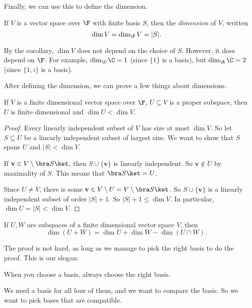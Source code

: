 \documentclass[a4paper]{article}
\begin{document}
Finally, we can use this to define the dimension.
\begin{defi}[Dimension]
  If $V$ is a vector space over $\F$ with finite basis $S$, then the \emph{dimension} of $V$, written
  \[
    \dim V = \dim_{\F}V = |S|.
  \]
\end{defi}
By the corollary, $\dim V$ does not depend on the choice of $S$. However, it does depend on $\F$. For example, $\dim_\C \C = 1$ (since $\{1\}$ is a basis), but $\dim_\R \C = 2$ (since $\{1, i\}$ is a basis).

After defining the dimension, we can prove a few things about dimensions.
\begin{lemma}
  If $V$ is a finite dimensional vector space over $\F$, $U\subseteq V$ is a proper subspace, then $U$ is finite dimensional and $\dim U < \dim V$.
\end{lemma}

\begin{proof}
  Every linearly independent subset of $V$ has size at most $\dim V$. So let $S \subseteq U$ be a linearly independent subset of largest size. We want to show that $S$ spans $U$ and $|S| < \dim V$.

  If $\mathbf{v}\in V\setminus \bra S\ket$, then $S\cup \{\mathbf{v}\}$ is linearly independent. So $\mathbf{v}\not\in U$ by maximality of $S$. This means that $\bra S\ket = U$.

  Since $U\not= V$, there is some $\mathbf{v}\in V\setminus U = V\setminus \bra S\ket$. So $S\cup \{\mathbf{v}\}$ is a linearly independent subset of order $|S| + 1$. So $|S| + 1 \leq \dim V$. In particular, $\dim U = |S| < \dim V$.
\end{proof}

\begin{prop}
  If $U, W$ are subspaces of a finite dimensional vector space $V$, then
  \[
    \dim (U + W) = \dim U + \dim W - \dim (U\cap W).
  \]
\end{prop}
The proof is not hard, as long as we manage to pick the right basis to do the proof. This is our slogan:
\begin{center}
  When you choose a basis, always choose the right basis.
\end{center}
We need a basis for all four of them, and we want to compare the basis. So we want to pick bases that are compatible.
\end{document}
